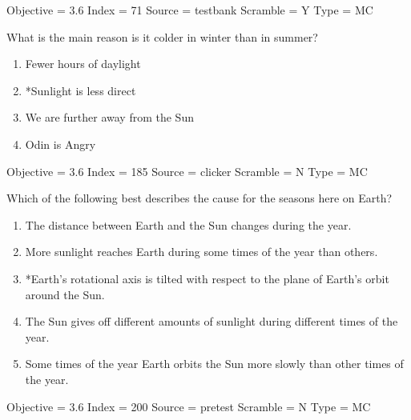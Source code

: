\documentclass[11pt]{article}
\begin{document}
\begin{enumerate}
\begin{minipage}{\textwidth}
\begin{minipage}{\textwidth}
Objective = 3.6
Index = 71
Source = testbank
Scramble = Y
Type = MC
\end{minipage}
\end{minipage}
\vskip 0.20in

\begin{minipage}{\textwidth}
\begin{minipage}{\textwidth}
\item What is the main reason is it colder in winter than in summer?
\begin{multicols}{2}
\begin{enumerate} 
\setlength{\itemsep}{1pt} 
\setlength{\parskip}{0pt} 
\setlength{\parsep}{0pt}
\setlength{\multicolsep}{1pt} 
\item Fewer hours of daylight
\item *Sunlight is less direct
\item We are further away from the Sun
\item Odin is Angry
\end{enumerate} 
\vfill 
\end{multicols}

Objective = 3.6
Index = 185
Source = clicker
Scramble = N
Type = MC
\end{minipage}
\end{minipage}
\vskip 0.20in

\begin{minipage}{\textwidth}
\begin{minipage}{\textwidth}
\item Which of the following best describes the cause for the seasons here on Earth?
\begin{enumerate} 
\setlength{\itemsep}{1pt} 
\setlength{\parskip}{0pt} 
\setlength{\parsep}{0pt}
\setlength{\multicolsep}{1pt} 
\item The distance between Earth and the Sun changes during the year.
\item More sunlight reaches Earth during some times of the year than others.
\item *Earth’s rotational axis is tilted with respect to the plane of Earth’s orbit around the Sun.
\item The Sun gives off different amounts of sunlight during different times of the year.
\item Some times of the year Earth orbits the Sun more slowly than other times of the year.
\end{enumerate} 
Objective = 3.6
Index = 200
Source = pretest
Scramble = N
Type = MC
\end{minipage}
\end{minipage}
\vskip 0.20in


\end{enumerate}
\end{document}

